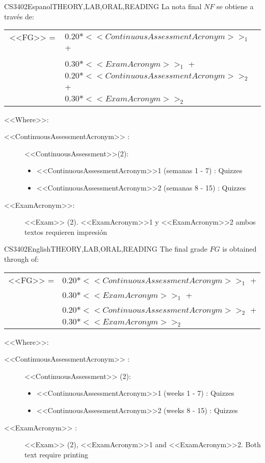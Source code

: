  
  \begin{evaluation}{CS3402}{Espanol}{THEORY,LAB,ORAL,READING}
  La nota final $NF$ se obtiene a través de:

  \begin{tabular}{cl}
   <<FG>> = ~ & $0.20*<<ContinuousAssessmentAcronym>>_{1}$ + \\
              & $0.30*<<ExamAcronym>>_{1}$ + \\
              & $0.20*<<ContinuousAssessmentAcronym>>_{2}$ + \\
              & $0.30*<<ExamAcronym>>_{2}$
  \end{tabular}

  \noindent <<Where>>:
  \begin{description}
      \item[<<ContinuousAssessmentAcronym>> :] <<ContinuousAssessment>>(2):
  \begin{itemize}
             \item  <<ContinuousAssessmentAcronym>>1 (semanas 1 - 7) : Quizzes
              \item <<ContinuousAssessmentAcronym>>2 (semanas 8 - 15) : Quizzes
    \end{itemize}
      \item[<<ExamAcronym>>:] <<Exam>> (2). <<ExamAcronym>>1 y <<ExamAcronym>>2 ambos textos requieren impresión
  \end{description}
  \end{evaluation}
 
  \begin{evaluation}{CS3402}{English}{THEORY,LAB,ORAL,READING}
  The final grade $FG$ is obtained through of:
 
  \begin{tabular}{cl}
      <<FG>> = & $0.20*<<ContinuousAssessmentAcronym>>_{1}$ +\\
               & $0.30*<<ExamAcronym>>_{1}$ +\\
               & $0.20*<<ContinuousAssessmentAcronym>>_{2}$ + \\
               & $0.30*<<ExamAcronym>>_{2}$
  \end{tabular}

  \noindent <<Where>>:
  \begin{description}
      \item[<<ContinuousAssessmentAcronym>> :] <<ContinuousAssessment>> (2):
            \begin{itemize}
               \item  <<ContinuousAssessmentAcronym>>1 (weeks 1 - 7)  : Quizzes
                \item <<ContinuousAssessmentAcronym>>2 (weeks 8 - 15) : Quizzes
            \end{itemize}
      \item[<<ExamAcronym>> :] <<Exam>> (2), <<ExamAcronym>>1 and <<ExamAcronym>>2. Both text require printing
  \end{description}
  \end{evaluation}


